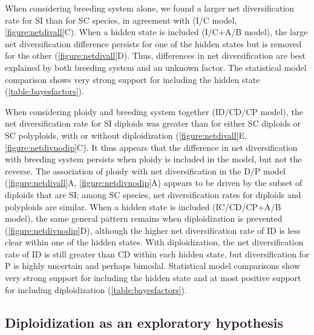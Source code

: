 When considering breeding system alone, we found a larger net diversification rate for SI than for SC species, in agreement with \citet{goldberg_2010} (I/C model, \cref{figure:netdivall}C).
When a hidden state is included (I/C+A/B model), the large net diversification difference persists for one of the hidden states but is removed for the other (\cref{figure:netdivall}D).
Thus, differences in net diversification are best explained by both breeding system and an unknown factor.
The statistical model comparison shows very strong support for including the hidden state (\cref{table:bayesfactors}).

When considering ploidy and breeding system together (ID/CD/CP model), the net diversification rate for SI diploids was greater than for either SC diploids or SC polyploids, with or without diploidization (\cref{figure:netdivall}E, \cref{figure:netdivnodip}C).
It thus appears that the difference in net diversification with breeding system persists when ploidy is included in the model, but not the reverse.
The association of ploidy with net diversification in the D/P model (\cref{figure:netdivall}A, \cref{figure:netdivnodip}A) appears to be driven by the subset of diploids that are SI; among SC species, net diversification rates for diploids and polyploids are similar.
%
When a hidden state is included (IC/CD/CP+A/B model), the same general pattern remains when diploidization is prevented (\cref{figure:netdivnodip}D), although the higher net diversification rate of ID is less clear within one of the hidden states.
With diploidization, the net diversification rate of ID is still greater than CD within each hidden state, but diversification for P is highly uncertain and perhaps bimodal.
Statistical model comparisons show very strong support for including the hidden state and at most positive support for including diploidization (\cref{table:bayesfactors}).


\subsection{Diploidization as an exploratory hypothesis}


